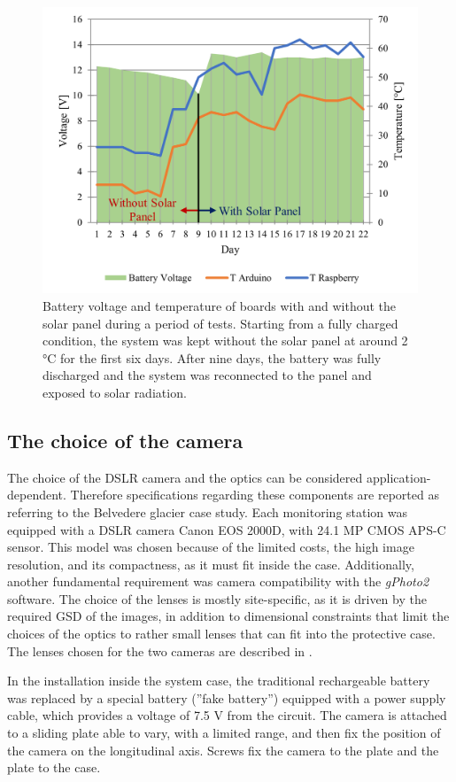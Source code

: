 \begin{figure}[ht!]
  \centering
  \includegraphics[width=.6\textwidth]{nominal.png}
  \caption{Battery voltage and temperature of boards with and without the solar panel during a period of tests. 
  Starting from a fully charged condition, the system was kept without the solar panel at around 2 °C for the first six days.
  After nine days, the battery was fully discharged and the system was reconnected to the panel and exposed to solar radiation.}
  \label{fig:4:nominal_performance}
\end{figure}

\subsection{The choice of the camera}\label{camera}

The choice of the DSLR camera and the optics can be considered application-dependent.
Therefore specifications regarding these components are reported as referring to the Belvedere glacier case study. 
Each monitoring station was equipped with a DSLR camera Canon EOS 2000D, with 24.1 MP CMOS \mbox{APS-C} sensor. 
This model was chosen because of the limited costs, the high image resolution, and its compactness, as it must fit inside the case. 
Additionally, another fundamental requirement was camera compatibility with the \textit{gPhoto2} software. 
The choice of the lenses is mostly site-specific, as it is driven by the required GSD of the images, in addition
to dimensional constraints that limit the choices of the optics to rather small lenses that can fit into the protective case.
The lenses chosen for the two cameras are described in .

In the installation inside the system case, the traditional rechargeable battery was replaced by a special battery 
(”fake battery”) equipped with a power supply cable, which provides a voltage of 7.5 V from the circuit. 
The camera is attached to a sliding plate able to vary, with a limited range, and then fix the position of the camera 
on the longitudinal axis. Screws fix the camera to the plate and the plate to the case.

